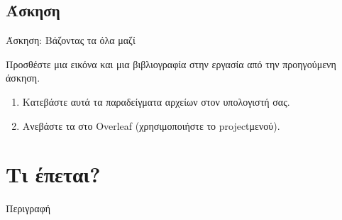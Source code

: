 \documentclass{beamer}
\begin{document}
\subsection{Άσκηση}
\begin{frame}[fragile]{Άσκηση: Βάζοντας τα όλα μαζί}

Προσθέστε μια εικόνα και μια βιβλιογραφία στην εργασία από την προηγούμενη άσκηση.

\begin{enumerate}
\item Κατεβάστε αυτά τα παραδείγματα αρχείων στον υπολογιστή σας.

\begin{center}

\end{center}

\item Ανεβάστε τα στο \en Overleaf \gr (χρησιμοποιήστε το \en project\gr \space μενού).

\end{enumerate}
\end{frame}

\section{Τι έπεται?}

\begin{frame}{Περιγραφή}
\begin{multicols}{2}
\tableofcontents[currentsection]
\end{multicols}
\end{frame}

\end{document}
